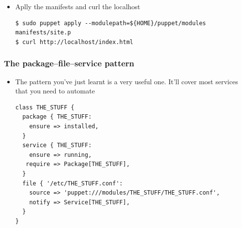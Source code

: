 \documentclass{beamer}
\begin{document}
\begin{frame}
\begin{itemize}
\lstset{language=shell}
\begin{lstlisting}[escapechar=&]
$ mkdir -p modules/httpd/files/var/www/html/
$ cp echo 'Hello World! in /var/www/html/index.htlm' > modules/httpd/files/var/www/html/index.html
\end{lstlisting}

\lstset{language=shell}
\begin{lstlisting}[escapechar=&]
# modules/httpd/manifests/init.pp
&\vdots&
  file { "/var/www/html/index.html":
    owner => "root",
    group => "root",
    mode => 0644,
    source => 'puppet:///modules/httpd/var/www/html/index.html',
    require => Package['httpd'],
  }
}
\end{lstlisting}

\item Aplly the manifests and curl the localhost

\lstset{language=shell}
\begin{lstlisting}[escapechar=&]
$ sudo puppet apply --modulepath=${HOME}/puppet/modules manifests/site.p
$ curl http://localhost/index.html
\end{lstlisting}


\end{itemize}
\end{frame}
\begin{frame}[fragile]
\frametitle{The package–file–service pattern}
\begin{itemize}
\item The pattern you've just learnt is a very useful one. It'll cover most services that you
need to automate
\lstset{language=shell}
\begin{lstlisting}[escapechar=&]
class THE_STUFF {
  package { THE_STUFF:
    ensure => installed,
  }
  service { THE_STUFF:
    ensure => running,
   require => Package[THE_STUFF],
  }
  file { '/etc/THE_STUFF.conf':
    source => 'puppet:///modules/THE_STUFF/THE_STUFF.conf',
    notify => Service[THE_STUFF],
  }
}
\end{lstlisting}

\end{itemize}

\end{frame}
\end{document}
